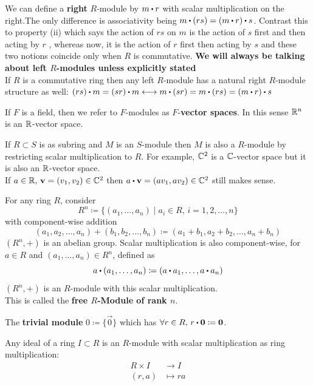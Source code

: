 \documentclass[../Main.tex]{subfiles}
\begin{document}
\Note We can define a \textbf{right} $R$-module by $m\rdot r$ with scalar multiplication on the right.The only difference is associativity being $m\rdot (rs) = (m\rdot r)\rdot s$. Contrast this to property (ii) which says the action of $rs$ on $m$ is the action of $s$ first and then acting by $r$ , whereas now, it is the action of $r$ first then acting by $s$ and these two notions coincide only when $R$ is commutative. \textbf{We will always be talking about left $R$-modules unless explicitly stated}\\
\Note If $R$ is a commutative ring then any left $R$-module has a natural right $R$-module structure as well:
$(rs)\rdot m = (sr)\rdot m \longleftrightarrow m\rdot (sr) = m\rdot (rs) = (m\rdot r)\rdot s$
\begin{dfn}[title =  \texorpdfstring{$F$}{F}-vector space]
	If $F$ is a field, then we refer to $F$-modules as $F$-\textbf{vector spaces}. In this sense $\mathbb{R}^n$ is an $\mathbb{R}$-vector space.
\end{dfn}
\Obs If $R\subset S$ is as subring and $M$ is an $S$-module then $M$ is also a $R$-module by restricting scalar multiplication to $R$. For example, $\mathbb{C}^2$ is a $\mathbb{C}$-vector space but it is also an $\mathbb{R}$-vector space. \\
If $a\in \mathbb{R},\, \mathbf{v} = (v_1,v_2)\in \mathbb{C}^2$ then $a\rdot \vv = (av_1,av_2)\in \C^2$ still makes sense.
\begin{example} 
	For any ring $R$, consider
	\[R^n \coloneqq \{(a_1,\dots,a_n)\mid a_i\in R, \, i=1,2,\dots,n\}\]
	with component-wise addition 
	\[(a_1,a_2,\dots,a_n)+(b_1,b_2,\dots,b_n) \coloneqq (a_1+b_1,a_2+b_2,\dots,a_n+b_n)\]
	\Exr $(R^n,+)$ is an abelian group.
	Scalar multiplication is also component-wise, for $a\in R$ and $(a_1,\dots,a_n)\in R^n$, defined as
	\[a\rdot (a_1,\dots,a_n)\coloneqq (a\rdot a_1,\dots,a\rdot a_n)\]
	\Exr $(R^n,+)$ is an $R$-module with this scalar multiplication.\\
	This is called the \textbf{free $R$-Module of rank $n$}. 
\end{example}
\begin{example}
	The \textbf{trivial module} $0\coloneqq \{\vec{0}\}$ which has $\forall r \in R, \, r\rdot \vec{0} \coloneqq \vec{0}$.
\end{example}
\begin{example}
	Any ideal of a ring $I\subset R$ is an $R$-module with scalar multiplication as  ring multiplication:
	\begin{align*}
	R \times I &\to I\\
	(r,a) &\mapsto ra
	\end{align*}
\end{example}
\end{document}

